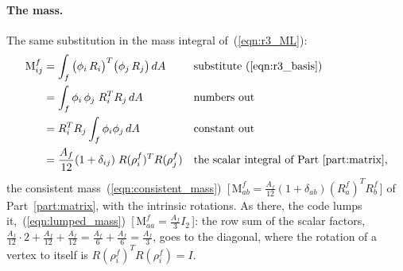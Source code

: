\paragraph{The mass.} The same substitution in the mass integral of~(\ref{eqn:r3_ML}):
\begin{align*}
\mathrm M^f_{ij} &= \int_f \big(\phi_i\, R_i\big)^T\big(\phi_j\, R_j\big)\, dA && \text{substitute (\ref{eqn:r3_basis})} \\
&= \int_f \phi_i\,\phi_j\; R_i^TR_j\, dA && \text{numbers out} \\
&= R_i^TR_j\int_f\phi_i\phi_j\, dA && \text{constant out} \\
&= \frac{A_f}{12}(1 + \delta_{ij})\; R(\rho_i^f)^TR(\rho_j^f) && \text{the scalar integral of Part~\ref{part:matrix},}
\end{align*}
the consistent mass~(\ref{eqn:consistent_mass})~[\,$\mathrm M^f_{ab} = \frac{A_f}{12}(1 + \delta_{ab})(R_a^f)^TR_b^f$\,] of Part~\ref{part:matrix}, with the intrinsic rotations. As there, the code lumps it,~(\ref{eqn:lumped_mass})~[\,$\mathrm M^f_{aa} = \frac{A_f}3 I_2$\,]: the row sum of the scalar factors, $\frac{A_f}{12}\cdot 2 + \frac{A_f}{12} + \frac{A_f}{12} = \frac{A_f}{6} + \frac{A_f}{6} = \frac{A_f}{3}$, goes to the diagonal, where the rotation of a vertex to itself is $R(\rho_i^f)^TR(\rho_i^f) = I$.

